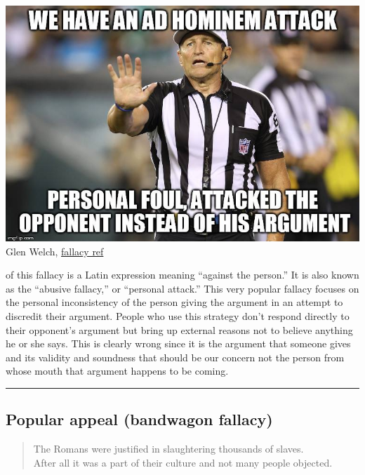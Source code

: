 \documentclass[justified]{tufte-book}
\newenvironment{argument}{\begin{quote}\normalsize}{\end{quote}}
\begin{document}
\begin{marginfigure}
\includegraphics{img/fallacies/ad-hominem.jpg}\\
Glen Welch, \href{https://twitter.com/fallacy_ref?lang=en}{fallacy ref}
\end{marginfigure}

 of this fallacy is a Latin expression meaning ``against the person.'' It is also known as the ``abusive fallacy,'' or ``personal attack.'' This very popular fallacy focuses on the personal inconsistency of the person giving the argument in an attempt to discredit their argument. People who use this strategy don't respond directly to their opponent's argument but bring up external reasons not to believe anything he or she says. This is clearly wrong since it is the argument that someone gives and its validity and soundness that should be our concern not the person from whose mouth that argument happens to be coming.

\begin{center}\rule{0.5\linewidth}{\linethickness}\end{center}

\hypertarget{popular-appeal-bandwagon-fallacy}{%
\subsection*{Popular appeal (bandwagon fallacy)}\label{popular-appeal-bandwagon-fallacy}}

\begin{argument}
The Romans were justified in slaughtering thousands of slaves.\\
After all it was a part of their culture and not many people objected.
\end{argument}
\end{document}
